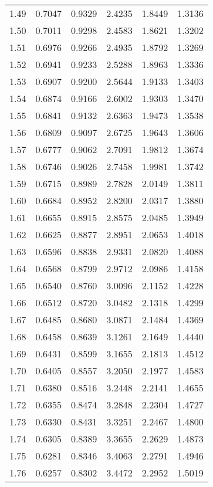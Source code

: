 \documentclass{article}
\begin{document}
\begin{longtable}{cccccc}
1.49 & 0.7047 & 0.9329 & 2.4235 & 1.8449 & 1.3136 \\
1.50 & 0.7011 & 0.9298 & 2.4583 & 1.8621 & 1.3202 \\
1.51 & 0.6976 & 0.9266 & 2.4935 & 1.8792 & 1.3269 \\
1.52 & 0.6941 & 0.9233 & 2.5288 & 1.8963 & 1.3336 \\
1.53 & 0.6907 & 0.9200 & 2.5644 & 1.9133 & 1.3403 \\
1.54 & 0.6874 & 0.9166 & 2.6002 & 1.9303 & 1.3470 \\
1.55 & 0.6841 & 0.9132 & 2.6363 & 1.9473 & 1.3538 \\
1.56 & 0.6809 & 0.9097 & 2.6725 & 1.9643 & 1.3606 \\
1.57 & 0.6777 & 0.9062 & 2.7091 & 1.9812 & 1.3674 \\
1.58 & 0.6746 & 0.9026 & 2.7458 & 1.9981 & 1.3742 \\
1.59 & 0.6715 & 0.8989 & 2.7828 & 2.0149 & 1.3811 \\
1.60 & 0.6684 & 0.8952 & 2.8200 & 2.0317 & 1.3880 \\
1.61 & 0.6655 & 0.8915 & 2.8575 & 2.0485 & 1.3949 \\
1.62 & 0.6625 & 0.8877 & 2.8951 & 2.0653 & 1.4018 \\
1.63 & 0.6596 & 0.8838 & 2.9331 & 2.0820 & 1.4088 \\
1.64 & 0.6568 & 0.8799 & 2.9712 & 2.0986 & 1.4158 \\
1.65 & 0.6540 & 0.8760 & 3.0096 & 2.1152 & 1.4228 \\
1.66 & 0.6512 & 0.8720 & 3.0482 & 2.1318 & 1.4299 \\
1.67 & 0.6485 & 0.8680 & 3.0871 & 2.1484 & 1.4369 \\
1.68 & 0.6458 & 0.8639 & 3.1261 & 2.1649 & 1.4440 \\
1.69 & 0.6431 & 0.8599 & 3.1655 & 2.1813 & 1.4512 \\
1.70 & 0.6405 & 0.8557 & 3.2050 & 2.1977 & 1.4583 \\
1.71 & 0.6380 & 0.8516 & 3.2448 & 2.2141 & 1.4655 \\
1.72 & 0.6355 & 0.8474 & 3.2848 & 2.2304 & 1.4727 \\
1.73 & 0.6330 & 0.8431 & 3.3251 & 2.2467 & 1.4800 \\
1.74 & 0.6305 & 0.8389 & 3.3655 & 2.2629 & 1.4873 \\
1.75 & 0.6281 & 0.8346 & 3.4063 & 2.2791 & 1.4946 \\
1.76 & 0.6257 & 0.8302 & 3.4472 & 2.2952 & 1.5019 \\

\end{longtable}
\end{document}
